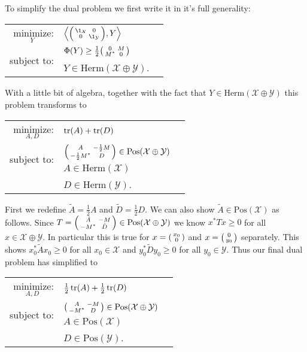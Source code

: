 \documentclass[boxes,pages,color=SeaGreen]{homework}
\newcommand{\X}{\mathcal{X}}
\newcommand{\Y}{\mathcal{Y}}
\newcommand{\Pos}{\mathrm{Pos}}
\newcommand{\Herm}{\mathrm{Herm}}
\begin{document}
\begin{solution}
    To simplify the dual problem we first write it in it's full generality:
    \begin{center}
        \begin{tabular}{rl}
            $\underset{Y}{\text{minimize}}$: & $\left\langle \smqty(\1_\X        & 0 \\ 0 & \1_\Y), Y\right\rangle$ \\ \cmidrule(lr{1em}){2-2}
            \multirow{2}{*}{subject to:}     & $\Phi(Y) \geq \frac{1}{2}\smqty(0 & M \\ M^* & 0)$    \\
                                             & $Y\in\Herm(\X\oplus \Y)$.
        \end{tabular}
    \end{center}
    With a little bit of algebra, together with the fact that $Y\in\Herm(\X\oplus\Y)$ this problem transforms to
    \begin{center}
        \begin{tabular}{rl}
            $\underset{A, D}{\text{minimize}}$: & $\tr(A) + \tr(D)$                 \\ \cmidrule(lr{1em}){2-2}
            \multirow{2}{*}{subject to:}        & $\smqty(A         & -\frac{1}{2}M \\ -\frac{1}{2}M^* & D)\in\Pos(\X\oplus \Y)$    \\
                                                & $A\in\Herm(\X)$                   \\
                                                & $D\in\Herm(\Y)$.
        \end{tabular}
    \end{center}
    First we redefine $\tilde{A} = \frac{1}{2}A$ and $\tilde{D} = \frac{1}{2}D$.
    We can also show $\tilde{A}\in\Pos(\X)$ as follows.
    Since $T = \smqty(\tilde{A} & - M \\ -M^* & \tilde{D})\in\Pos(\X\oplus\Y)$ we know $x^*Tx\geq 0$ for all $x\in\X\oplus\Y$.
    In particular this is true for $x = \smqty(x_0 \\ 0)$ and $x = \smqty(0 \\ y_0)$ separately.
    This shows $x_0^*\tilde{A}x_0 \geq 0$ for all $x_0\in\X$ and $y_0^*\tilde{D}y_0 \geq 0$ for all $y_0\in\Y$.
    Thus our final dual problem has simplified to
    \begin{center}
        \begin{tabular}{rl}
            $\underset{A, D}{\text{minimize}}$: & $\frac{1}{2}\tr(A) + \frac{1}{2}\tr(D)$      \\ \cmidrule(lr{1em}){2-2}
            \multirow{2}{*}{subject to:}        & $\smqty(A                               & -M \\ -M^* & D)\in\Pos(\X\oplus \Y)$    \\
                                                & $A\in\Pos(\X)$                               \\
                                                & $D\in\Pos(\Y)$.
        \end{tabular}
    \end{center}


\end{solution}
\end{document}
